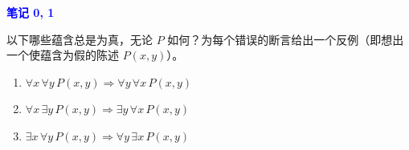 \documentclass[11pt]{article}
\begin{document}
\textcolor{blue}{\textbf{笔记 0, 1}}

以下哪些蕴含总是为真，无论 $P$ 如何？为每个错误的断言给出一个反例（即想出一个使蕴含为假的陈述 $P(x,y)$）。

\begin{enumerate}[label=(\alph*)]
\item $\forall x\,\forall y\,P(x,y) \Rightarrow \forall y\,\forall x\,P(x,y)$

\item $\forall x\,\exists y\,P(x,y) \Rightarrow \exists y\,\forall x\,P(x,y)$

\item $\exists x\,\forall y\,P(x,y) \Rightarrow \forall y\,\exists x\,P(x,y)$
\end{enumerate}
\end{document}
